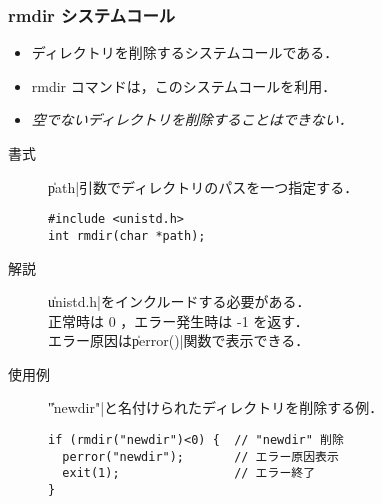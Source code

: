 \documentclass{beamer}                 %
\begin{document}
\begin{frame}[fragile]
  \frametitle{rmdir システムコール}
  \begin{itemize}
  \item ディレクトリを削除するシステムコールである．
  \item rmdir コマンドは，このシステムコールを利用．
  \item \emph{空でないディレクトリを削除することはできない．}
  \end{itemize}

  \begin{description}
  \item[書式] \|path|引数でディレクトリのパスを一つ指定する．
\begin{verbatim}
#include <unistd.h>
int rmdir(char *path);
\end{verbatim}

  \item[解説] \|unistd.h|をインクルードする必要がある．\\
    正常時は 0 ，エラー発生時は -1 を返す．\\
    エラー原因は\|perror()|関数で表示できる．

  \item[使用例] \|"newdir"|と名付けられたディレクトリを削除する例．
\begin{verbatim}
if (rmdir("newdir")<0) {  // "newdir" 削除
  perror("newdir");       // エラー原因表示
  exit(1);                // エラー終了
}
\end{verbatim}
  \end{description}
\end{frame}
\end{document}
